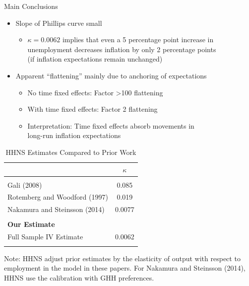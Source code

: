 \documentclass[10pt]{beamer}
\begin{document}
\begin{frame}{Main Conclusions}
	\begin{itemize}
		\itemsep1em 
		\item Slope of Phillips curve small
		\begin{itemize}
			\item $\kappa = 0.0062$ implies that even a 5 percentage point increase in unemployment decreases inflation by only 2 percentage points \\ (if inflation expectations remain unchanged)
		\end{itemize}
		\item Apparent ``flattening'' mainly due to anchoring of expectations
		\begin{itemize}
			\item No time fixed effects: Factor >100 flattening
			\item With time fixed effects: Factor 2 flattening \vspace{2mm}
			\item Interpretation: Time fixed effects absorb movements in \\ long-run inflation expectations
		\end{itemize}
	\end{itemize}
\end{frame}


\begin{frame}
	\begin{table}
		\centering 
		\small 
		\caption{HHNS Estimates Compared to Prior Work} \vspace{-5pt}
		\begin{tabular}{p{5.5cm}c} \hline \hline
			& $\kappa$ \\ \hline \\ [-2mm]
			Gali (2008) & 0.085 \\
			Rotemberg and Woodford (1997) & 0.019 \\
			Nakamura and Steinsson (2014) & 0.0077 \\ \\ [-2mm]
			\textbf{Our Estimate} \\
			Full Sample IV Estimate & 0.0062 \\ \\ [-2mm] \hline
		\end{tabular}
		\begin{minipage}[c]{4in}
			\footnotesize \baselineskip=11pt \vspace{5pt}
			Note: HHNS adjust prior estimates by the elasticity of output with respect to employment in the model in these papers. For Nakamura and Steinsson (2014), HHNS use the calibration with GHH preferences. 
		\end{minipage}
	\end{table}
\end{frame}
\end{document}
